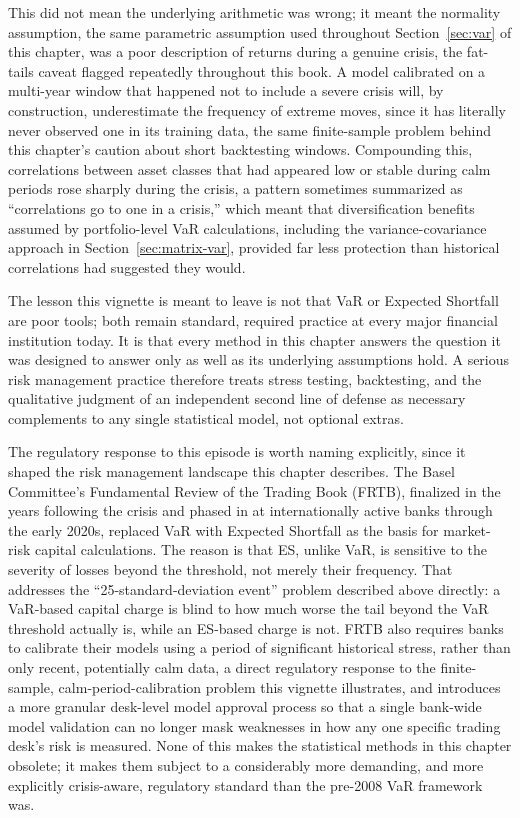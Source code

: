 \documentclass[../ai_in_finance]{subfiles}
\begin{document}
This did not mean the underlying arithmetic was wrong; it meant the normality assumption, the same parametric assumption used throughout Section~\ref{sec:var} of this chapter, was a poor description of returns during a genuine crisis, the fat-tails caveat flagged repeatedly throughout this book. A model calibrated on a multi-year window that happened not to include a severe crisis will, by construction, underestimate the frequency of extreme moves, since it has literally never observed one in its training data, the same finite-sample problem behind this chapter's caution about short backtesting windows.
Compounding this, correlations between asset classes that had appeared low or stable during calm periods rose sharply during the crisis, a pattern sometimes summarized as ``correlations go to one in a crisis,'' which meant that diversification benefits assumed by portfolio-level VaR calculations, including the variance-covariance approach in Section~\ref{sec:matrix-var}, provided far less protection than historical correlations had suggested they would.

The lesson this vignette is meant to leave is not that VaR or Expected Shortfall are poor tools; both remain standard, required practice at every major financial institution today. It is that every method in this chapter answers the question it was designed to answer only as well as its underlying assumptions hold. A serious risk management practice therefore treats stress testing, backtesting, and the qualitative judgment of an independent second line of defense as necessary complements to any single statistical model, not optional extras.

The regulatory response to this episode is worth naming explicitly, since it shaped the risk management landscape this chapter describes.
The Basel Committee's Fundamental Review of the Trading Book (FRTB), finalized in the years following the crisis and phased in at internationally active banks through the early 2020s, replaced VaR with Expected Shortfall as the basis for market-risk capital calculations. The reason is that ES, unlike VaR, is sensitive to the severity of losses beyond the threshold, not merely their frequency. That addresses the ``25-standard-deviation event'' problem described above directly: a VaR-based capital charge is blind to how much worse the tail beyond the VaR threshold actually is, while an ES-based charge is not.
FRTB also requires banks to calibrate their models using a period of significant historical stress, rather than only recent, potentially calm data, a direct regulatory response to the finite-sample, calm-period-calibration problem this vignette illustrates, and introduces a more granular desk-level model approval process so that a single bank-wide model validation can no longer mask weaknesses in how any one specific trading desk's risk is measured. None of this makes the statistical methods in this chapter obsolete; it makes them subject to a considerably more demanding, and more explicitly crisis-aware, regulatory standard than the pre-2008 VaR framework was.
\end{document}
